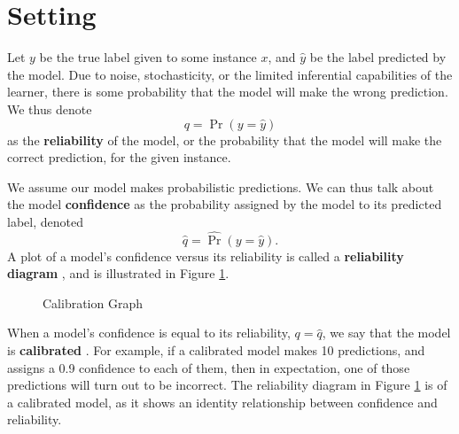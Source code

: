 
\section{Setting} \label{cddm:setting}

Let $y$ be the true label given to some instance $x$, and $\hat{y}$ be the label predicted by the model. Due to noise, stochasticity, or the limited inferential capabilities of the learner, there is some probability that the model will make the wrong prediction. We thus denote
\begin{equation}
q = \Pr(y=\hat{y})
\end{equation}
as the {\bf reliability} of the model, or the probability that the model will make the correct prediction, for the given instance. 

We assume our model makes probabilistic predictions. We can thus talk about the model {\bf confidence} as the probability assigned by the model to its predicted label, denoted
\begin{equation}
\hat{q} = \hat{\Pr}(y=\hat{y}).
\end{equation}
A plot of a model's confidence versus its reliability is called a {\bf reliability diagram} \cite{calibrating}, and is illustrated in Figure \ref{fig:calibration}. 

\newcommand{\calibrationgraph}[7][]{
    \draw [thick, <->] (0,1.25) -- (0,0) -- (1.25,0);
    \node [below] at (1.25,0) {$\hat{q}$};
    14
    \node [left] at (0,1.25) {$q$};
    \node [left] at (0,#7) {$q_t$};
    \node [below] at (#6,0) {$\hat{q}_t$};
    \draw (#2,#3) -- (#4,#5);
    \draw [red] (#6,0) -- (#6,#7);
    \draw [red, dashed] (0,#7) -- (#6,#7);
}

\begin{figure}
    \centering
    \caption{Calibration Graph}
    \label{fig:calibration}
\end{figure}

When a model's confidence is equal to its reliability, $q=\hat{q}$, we say that the model is {\bf calibrated} \cite{superforecasting}\cite{scoring_rules}\cite{calibrating}. For example, if a calibrated model makes 10 predictions, and assigns a 0.9 confidence to each of them, then in expectation, one of those predictions will turn out to be incorrect. The reliability diagram in Figure \ref{fig:calibration} is of a calibrated model, as it shows an identity relationship between confidence and reliability.

